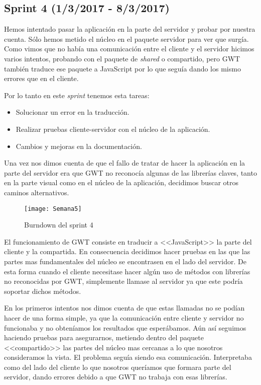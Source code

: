 \subsection{Sprint 4 (1/3/2017 - 8/3/2017)}
Hemos intentado pasar la aplicación en la parte del servidor y probar por nuestra cuenta. Sólo hemos metido el núcleo en el paquete servidor para ver que surgía. Como vimos que no había una comunicación entre el cliente y el servidor hicimos varios intentos, probando con el paquete de \emph{shared} o compartido, pero GWT también traduce ese paquete a JavaScript por lo que seguía dando los mismo errores que en el cliente.

Por lo tanto en este \emph{sprint} tenemos esta tareas:

\begin{itemize}
\item Solucionar un error en la traducción.
\item Realizar pruebas cliente-servidor con el núcleo de la aplicación.
\item Cambios y mejoras en la documentación.
\end{itemize}

Una vez nos dimos cuenta de que el fallo de tratar de hacer la aplicación en la parte del servidor era que GWT no reconocía algunas de las librerías claves, tanto en la parte visual como en el núcleo de la aplicación, decidimos buscar otros caminos alternativos. 


\begin{figure}[h]
\centering
\texttt{[image: Semana5]}
\caption{Burndown del sprint 4}
\label{fig:A.3}
\end{figure}

El funcionamiento de GWT consiste en traducir a <<JavaScript>> la parte del cliente y la compartida. En consecuencia decidimos hacer pruebas en las que las partes mas fundamentales del núcleo se encontrasen en el lado del servidor. De esta forma cuando el cliente necesitase hacer algún uso de métodos con librerías no reconocidas por GWT, simplemente llamase al servidor ya que este podría soportar dichos métodos. 

En los primeros intentos nos dimos cuenta de que estas llamadas no se podían hacer de una forma simple, ya que la comunicación entre cliente y servidor no funcionaba y no obteníamos los resultados que esperábamos. Aún así seguimos haciendo pruebas para asegurarnos, metiendo dentro del paquete <<compartido>> las partes del núcleo mas cercanas a lo que nosotros consideramos la vista. El problema seguía siendo esa comunicación. Interpretaba como del lado del cliente lo que nosotros queríamos que formara parte del servidor, dando errores debido a que GWT no trabaja con esas librerías.

